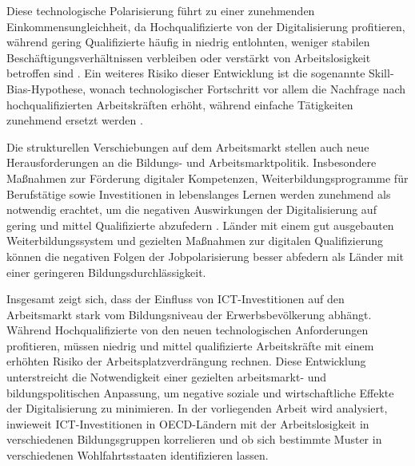 Diese technologische Polarisierung führt zu einer zunehmenden Einkommensungleichheit, da 
Hochqualifizierte von der Digitalisierung profitieren, während gering Qualifizierte häufig 
in niedrig entlohnten, weniger stabilen Beschäftigungsverhältnissen verbleiben oder 
verstärkt von Arbeitslosigkeit betroffen sind \parencite[S. 10]{acemoglu2002technical}. 
Ein weiteres Risiko dieser Entwicklung ist die sogenannte Skill-Bias-Hypothese, wonach 
technologischer Fortschritt vor allem die Nachfrage nach hochqualifizierten Arbeitskräften 
erhöht, während einfache Tätigkeiten zunehmend ersetzt werden 
\parencite[S. 25]{goos2014explaining}.

Die strukturellen Verschiebungen auf dem Arbeitsmarkt stellen auch neue Herausforderungen 
an die Bildungs- und Arbeitsmarktpolitik. Insbesondere Maßnahmen zur Förderung digitaler 
Kompetenzen, Weiterbildungsprogramme für Berufstätige sowie Investitionen in lebenslanges 
Lernen werden zunehmend als notwendig erachtet, um die negativen Auswirkungen der 
Digitalisierung auf gering und mittel Qualifizierte abzufedern 
\parencite[S. 75]{brynjolfsson2015thesecond}. Länder mit einem gut ausgebauten 
Weiterbildungssystem und gezielten Maßnahmen zur digitalen Qualifizierung können die 
negativen Folgen der Jobpolarisierung besser abfedern als Länder mit einer geringeren 
Bildungsdurchlässigkeit.

Insgesamt zeigt sich, dass der Einfluss von \ac{ICT}-Investitionen auf den Arbeitsmarkt 
stark vom Bildungsniveau der Erwerbsbevölkerung abhängt. Während Hochqualifizierte von den 
neuen technologischen Anforderungen profitieren, müssen niedrig und mittel qualifizierte 
Arbeitskräfte mit einem erhöhten Risiko der Arbeitsplatzverdrängung rechnen. Diese 
Entwicklung unterstreicht die Notwendigkeit einer gezielten arbeitsmarkt- und 
bildungspolitischen Anpassung, um negative soziale und wirtschaftliche Effekte der 
Digitalisierung zu minimieren. In der vorliegenden Arbeit wird analysiert, inwieweit 
\ac{ICT}-Investitionen in \ac{OECD}-Ländern mit der Arbeitslosigkeit in verschiedenen 
Bildungsgruppen korrelieren und ob sich bestimmte Muster in verschiedenen Wohlfahrtsstaaten 
identifizieren lassen.
